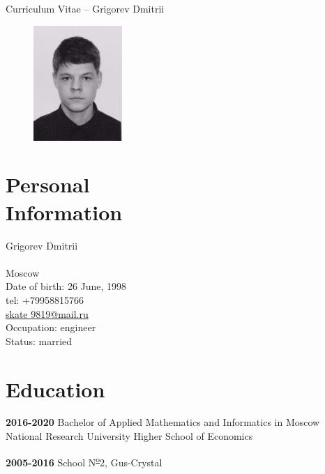 \documentclass[margin,line,a4paper]{resume}
\begin{document}
{\sc \Large Curriculum Vitae -- Grigorev Dmitrii}
\begin{resume}
    \vspace{0.5cm}
    \begin{figure}
        \vspace{-1cm}
       \begin{center}
       \includegraphics[width=0.3\textwidth]{mono_dima.jpg}
       \end{center}
        \vspace{-1cm}
    \end{figure}
    


    \section{\mysidestyle Personal\\Information}%
    Grigorev Dmitrii \\
    \\
    Moscow\\
    Date of birth: 26 June, 1998\\
    tel: +79958815766 \\
    \href{mailto: skate\underline{ }9819@mail.ru}{skate\underline{ }9819@mail.ru} \\
    Occupation: engineer \\
    Status: married\\


    \section{\mysidestyle Education}

    \textbf{2016-2020} Bachelor of Applied Mathematics and Informatics in Moscow National Research University Higher School of Economics 

    \textbf{2005-2016} School N\textsuperscript{\underline{o}}2, Gus-Crystal 
    

\end{resume}
\end{document}

